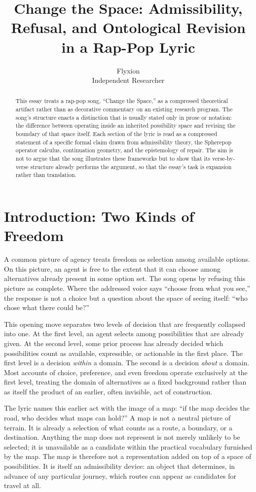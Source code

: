 \documentclass[11pt]{article}
\title{Change the Space: Admissibility, Refusal, and Ontological Revision in a Rap-Pop Lyric}
\author{Flyxion \\ Independent Researcher}
\date{}
\begin{document}
\maketitle

\begin{abstract}
This essay treats a rap-pop song, ``Change the Space,'' as a compressed theoretical artifact rather than as decorative commentary on an existing research program. The song's structure enacts a distinction that is usually stated only in prose or notation: the difference between operating inside an inherited possibility space and revising the boundary of that space itself. Each section of the lyric is read as a compressed statement of a specific formal claim drawn from admissibility theory, the Spherepop operator calculus, continuation geometry, and the epistemology of repair. The aim is not to argue that the song illustrates these frameworks but to show that its verse-by-verse structure already performs the argument, so that the essay's task is expansion rather than translation.
\end{abstract}

\section{Introduction: Two Kinds of Freedom}

A common picture of agency treats freedom as selection among available options. On this picture, an agent is free to the extent that it can choose among alternatives already present in some option set. The song opens by refusing this picture as complete. Where the addressed voice says ``choose from what you see,'' the response is not a choice but a question about the space of seeing itself: ``who chose what there could be?''

This opening move separates two levels of decision that are frequently collapsed into one. At the first level, an agent selects among possibilities that are already given. At the second level, some prior process has already decided which possibilities count as available, expressible, or actionable in the first place. The first level is a decision \emph{within} a domain. The second is a decision \emph{about} a domain. Most accounts of choice, preference, and even freedom operate exclusively at the first level, treating the domain of alternatives as a fixed background rather than as itself the product of an earlier, often invisible, act of construction.

The lyric names this earlier act with the image of a map: ``if the map decides the road, who decides what maps can hold?'' A map is not a neutral picture of terrain. It is already a selection of what counts as a route, a boundary, or a destination. Anything the map does not represent is not merely unlikely to be selected; it is unavailable as a candidate within the practical vocabulary furnished by the map. The map is therefore not a representation added on top of a space of possibilities. It is itself an admissibility device: an object that determines, in advance of any particular journey, which routes can appear as candidates for travel at all.
\end{document}
